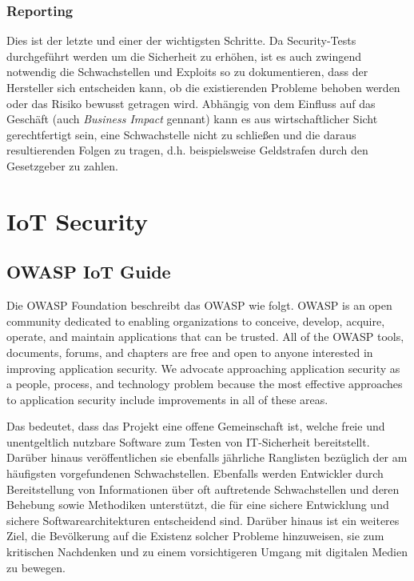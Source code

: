     \subsubsection{\glqq Reporting\grqq{}}
        Dies ist der letzte und einer der wichtigsten Schritte. Da Security-Tests durchgeführt werden um die Sicherheit zu erhöhen, ist es auch zwingend notwendig die Schwachstellen und Exploits so zu dokumentieren, dass der Hersteller sich entscheiden kann, ob die existierenden Probleme behoben werden oder das Risiko bewusst getragen wird. Abhängig von dem Einfluss auf das Geschäft (auch \emph{Business Impact} gennant) kann es aus wirtschaftlicher Sicht gerechtfertigt sein, eine Schwachstelle nicht zu schließen und die daraus resultierenden Folgen zu tragen, d.h. beispielsweise Geldstrafen durch den Gesetzgeber zu zahlen.

\section{IoT Security} \label{IoTSecurity}
    \subsection{OWASP IoT Guide}
        Die OWASP Foundation \cite{guzman_2019} beschreibt das \ac{OWASP} wie folgt.
        \glqq OWASP is an open community dedicated to enabling organizations to conceive, develop, acquire, operate, and maintain applications that can be trusted. All of the OWASP tools, documents, forums, and chapters are free and open to anyone interested in improving application security. We advocate approaching application security as a people, process, and technology problem because the most effective approaches to application security include improvements in all of these areas.\grqq{}
        
        Das bedeutet, dass das Projekt eine offene Gemeinschaft ist, welche freie und unentgeltlich nutzbare Software zum Testen von IT-Sicherheit bereitstellt. Darüber hinaus veröffentlichen sie ebenfalls jährliche Ranglisten bezüglich der am häufigsten vorgefundenen Schwachstellen. Ebenfalls werden Entwickler durch Bereitstellung von Informationen über oft auftretende Schwachstellen und deren Behebung sowie Methodiken unterstützt, die für eine sichere Entwicklung und sichere Softwarearchitekturen entscheidend sind. Darüber hinaus ist ein weiteres Ziel, die Bevölkerung auf die Existenz solcher Probleme hinzuweisen, sie zum kritischen Nachdenken und zu einem vorsichtigeren Umgang mit digitalen Medien zu bewegen.
        
